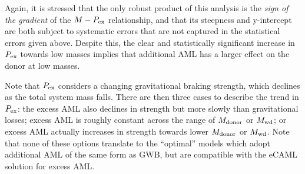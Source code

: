 Again, it is stressed that the only robust product of this analysis is the \textit{sign of the gradient} of the $M - P_{\rm ex}$ relationship, and that its steepness and y-intercept are both subject to systematic errors that are not captured in the statistical errors given above. Despite this, the clear and statistically significant increase in $P_{\rm ex}$ towards low masses implies that additional AML has a larger effect on the donor at low masses.

Note that $P_{\rm ex}$ considers a changing gravitational braking strength, which declines as the total system mass falls.
There are then three cases to describe the trend in $P_{\rm ex}$: the excess AML also declines in strength but more slowly than gravitational losses; excess AML is roughly constant across the range of $M_{\rm donor}$ or $M_{\rm wd}$; or excess AML actually increases in strength towards lower $M_{\rm donor}$ or $M_{\rm wd}$. Note that none of these options translate to the ``optimal'' \citet{knigge11} models which adopt additional AML of the same form as GWB, but are compatible with the eCAML solution for excess AML.


